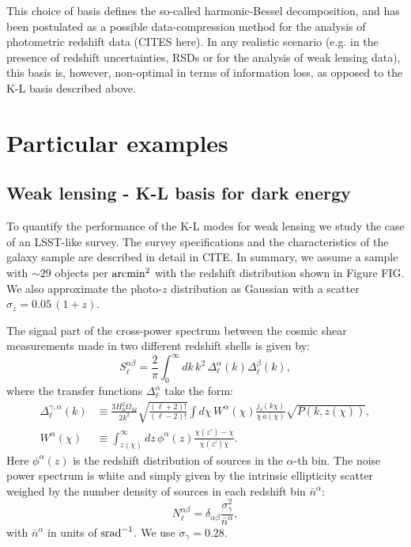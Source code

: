 \documentclass[a4paper,10pt]{article}
\begin{document}
   This choice of basis defines the so-called harmonic-Bessel decomposition, and has been postulated as a possible data-compression method for the analysis of photometric redshift data (CITES here). In any realistic scenario (e.g. in the presence of redshift uncertainties, RSDs or for the analysis of weak lensing data), this basis is, however, non-optimal in terms of information loss, as opposed to the K-L basis described above.

\section{Particular examples}
  \subsection{Weak lensing - K-L basis for dark energy}
    To quantify the performance of the K-L modes for weak lensing we study the case of an LSST-like survey. The survey specifications and the characteristics of the galaxy sample are described in detail in CITE. In summary, we assume a sample with $\sim29$ objects per ${\rm arcmin}^2$ with the redshift distribution shown in Figure FIG. We also approximate the photo-$z$ distribution as Gaussian with a scatter $\sigma_z=0.05\,(1+z)$.    
    
    The signal part of the cross-power spectrum between the cosmic shear measurements made in two different redshift shells is given by:
    \begin{equation}
      S^{\alpha\beta}_\ell=\frac{2}{\pi}\int_0^\infty dk\,k^2\,\Delta^\alpha_\ell(k)\Delta^\beta_\ell(k),
    \end{equation}
    where the transfer functions $\Delta^{\alpha}_\ell$ take the form:
    \begin{align}
      \Delta^{\gamma,\alpha}_\ell(k)&\equiv\frac{3H_0^2\Omega_M}{2k^2}\sqrt{\frac{(\ell+2)!}{(\ell-2)!}}\int d\chi\,W^\alpha(\chi)\frac{j_\ell(k\chi)}{\chi\,a(\chi)}\sqrt{P(k,z(\chi))},\\
      W^\alpha(\chi)&\equiv\int_{z(\chi)}^\infty dz\,\phi^\alpha(z)\frac{\chi(z')-\chi}{\chi(z')\chi}.
    \end{align}
    Here $\phi^\alpha(z)$ is the redshift distribution of sources in the $\alpha$-th bin. The noise power spectrum is white and simply given by the intrinsic ellipticity scatter weighed by the number density of sources in each redshift bin $\bar{n}^\alpha$:
    \begin{equation}
      N^{\alpha\beta}_\ell=\delta_{\alpha\beta}\frac{\sigma_\gamma^2}{\bar{n}^\alpha},
    \end{equation}
    with $\bar{n}^\alpha$ in units of ${\rm srad}^{-1}$. We use $\sigma_\gamma=0.28$.
    
\end{document}
